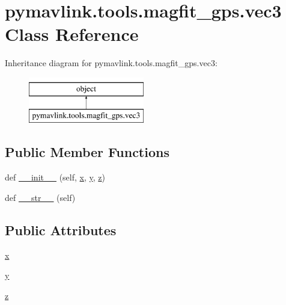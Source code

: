 \hypertarget{classpymavlink_1_1tools_1_1magfit__gps_1_1vec3}{}\section{pymavlink.\+tools.\+magfit\+\_\+gps.\+vec3 Class Reference}
\label{classpymavlink_1_1tools_1_1magfit__gps_1_1vec3}
Inheritance diagram for pymavlink.\+tools.\+magfit\+\_\+gps.\+vec3\+:\begin{figure}[H]
\begin{center}
\leavevmode
\includegraphics[height=2.000000cm]{classpymavlink_1_1tools_1_1magfit__gps_1_1vec3}
\end{center}
\end{figure}
\subsection*{Public Member Functions}
\begin{DoxyCompactItemize}
\item 
def \mbox{\hyperlink{classpymavlink_1_1tools_1_1magfit__gps_1_1vec3_a3302b13d06f07834294c0a4e978808de}{\+\_\+\+\_\+init\+\_\+\+\_\+}} (self, \mbox{\hyperlink{classpymavlink_1_1tools_1_1magfit__gps_1_1vec3_a4ad87009521fb010ec5978e9f0efaf03}{x}}, \mbox{\hyperlink{classpymavlink_1_1tools_1_1magfit__gps_1_1vec3_ad72ebec20299e4ea4125a12f2443334a}{y}}, \mbox{\hyperlink{classpymavlink_1_1tools_1_1magfit__gps_1_1vec3_a33b7c1a48c1646258532de882dbe4540}{z}})
\item 
def \mbox{\hyperlink{classpymavlink_1_1tools_1_1magfit__gps_1_1vec3_aa1a57c61eadfd5a3996c4ddb923f23ef}{\+\_\+\+\_\+str\+\_\+\+\_\+}} (self)
\end{DoxyCompactItemize}
\subsection*{Public Attributes}
\begin{DoxyCompactItemize}
\item 
\mbox{\hyperlink{classpymavlink_1_1tools_1_1magfit__gps_1_1vec3_a4ad87009521fb010ec5978e9f0efaf03}{x}}
\item 
\mbox{\hyperlink{classpymavlink_1_1tools_1_1magfit__gps_1_1vec3_ad72ebec20299e4ea4125a12f2443334a}{y}}
\item 
\mbox{\hyperlink{classpymavlink_1_1tools_1_1magfit__gps_1_1vec3_a33b7c1a48c1646258532de882dbe4540}{z}}
\end{DoxyCompactItemize}


